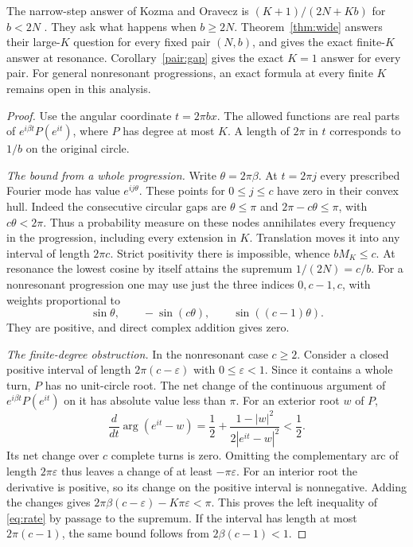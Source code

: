 \documentclass[11pt,letterpaper]{article}
\theoremstyle{remark}\newtheorem{remark}[theorem]{Remark}
\begin{document}
The narrow-step answer of Kozma and Oravecz is $(K+1)/(2N+Kb)$ for $b<2N$
\cite[Theorem 3]{KO}. They ask what happens when $b\ge2N$.
Theorem~\ref{thm:wide} answers their large-$K$ question for every fixed
pair $(N,b)$, and gives the exact finite-$K$ answer at resonance.
Corollary~\ref{pair:gap} gives the exact $K=1$ answer for every pair.
For general nonresonant progressions, an exact formula at every finite $K$ remains open in this analysis.

\begin{proof}
Use the angular coordinate $t=2\pi b x$. The allowed functions are real
parts of $e^{i\beta t}P(e^{it})$, where $P$ has degree at most $K$.
A length of $2\pi$ in $t$ corresponds to $1/b$ on the original circle.

\emph{The bound from a whole progression.}
Write $\theta=2\pi\beta$. At $t=2\pi j$ every prescribed Fourier mode
has value $e^{ij\theta}$. These points for $0\le j\le c$ have zero in their
convex hull. Indeed the consecutive circular gaps are $\theta\le\pi$ and
$2\pi-c\theta\le\pi$, with $c\theta<2\pi$. Thus a probability measure
on these nodes annihilates every frequency in the progression, including
every extension in $K$. Translation moves it into any interval of length
$2\pi c$. Strict positivity there is impossible, whence $bM_K\le c$.
At resonance the lowest cosine by itself attains the supremum $1/(2N)=c/b$.
For a nonresonant progression one may use just the three indices $0,c-1,c$,
with weights proportional to
\[
 \sin\theta,\qquad -\sin(c\theta),\qquad \sin((c-1)\theta).
\]
They are positive, and direct complex addition gives zero.

\emph{The finite-degree obstruction.}
In the nonresonant case $c\ge2$. Consider a closed positive interval of
length $2\pi(c-\varepsilon)$ with $0\le\varepsilon<1$. Since it contains
a whole turn, $P$ has no unit-circle root. The net change of the continuous
argument of $e^{i\beta t}P(e^{it})$ on it has absolute value less than $\pi$.
For an exterior root $w$ of $P$,
\[
 \frac{d}{dt}\arg(e^{it}-w)
 =\frac12+\frac{1-|w|^2}{2|e^{it}-w|^2}<\frac12 .
\]
Its net change over $c$ complete turns is zero. Omitting the complementary
arc of length $2\pi\varepsilon$ thus leaves a change of at least
$-\pi\varepsilon$. For an interior root the derivative is positive, so its
change on the positive interval is nonnegative. Adding the changes gives
$2\pi\beta(c-\varepsilon)-K\pi\varepsilon<\pi$. This proves the left
inequality of \eqref{eq:rate} by passage to the supremum. If the interval
has length at most $2\pi(c-1)$, the same bound follows from
$2\beta(c-1)<1$.


\end{proof}
\end{document}
